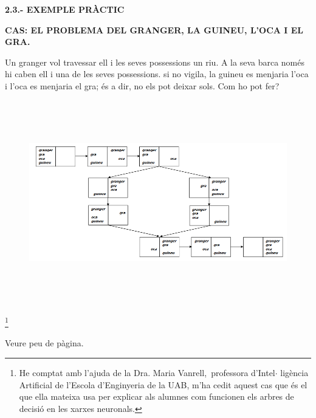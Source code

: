 \documentclass[12pt]{article}
\begin{document}
\vspace{\baselineskip}

\vspace{\baselineskip}

\vspace{\baselineskip}
\textbf{2.3.- EXEMPLE PRÀCTIC}\par


\vspace{\baselineskip}
\textbf{CAS: EL PROBLEMA DEL GRANGER, LA GUINEU, L’OCA I EL GRA. }\par

\begin{justify}
Un granger vol travessar ell i les seves possessions un riu. A la seva barca només hi caben ell i una de les seves possessions. si no vigila, la guineu es menjaria l’oca i l’oca es menjaria el gra; és a dir, no els pot deixar sols. Com ho pot fer?{\fontsize{18pt}{21.6pt}\selectfont  \par}
\end{justify}\par




\begin{figure}[H]
\advance\leftskip -1.13in		\includegraphics[width=7.57in,height=3.48in]{./media/image4.png}
\end{figure}



\par


\vspace{\baselineskip}
\begin{justify}
\footnote{ He comptat amb l’ajuda de la Dra. Maria Vanrell,\ professora d’Intel$ \cdot $ ligència Artificial de l’Escola d’Enginyeria de la UAB, m’ha cedit  aquest cas que és el que ella mateixa usa per explicar als alumnes com funcionen els arbres de decisió en les xarxes neuronals. } {\fontsize{10pt}{12.0pt}\selectfont Veure peu de pàgina. \par}
\end{justify}\par
\end{document}
